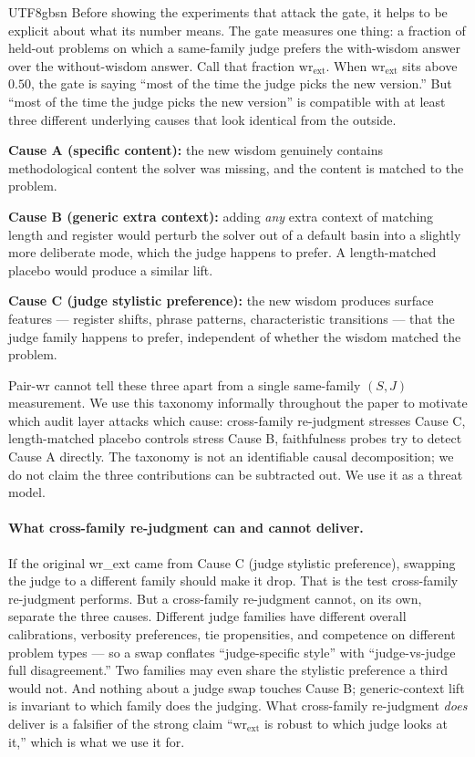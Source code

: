 \documentclass{article}
\begin{document}
\begin{CJK*}{UTF8}{gbsn}
Before showing the experiments that attack the gate, it helps to
be explicit about what its number means. The gate measures one
thing: a fraction of held-out problems on which a same-family
judge prefers the with-wisdom answer over the without-wisdom
answer. Call that fraction \(\mathrm{wr}_{\mathrm{ext}}\). When
\(\mathrm{wr}_{\mathrm{ext}}\) sits above \(0.50\), the gate is
saying ``most of the time the judge picks the new version.'' But
``most of the time the judge picks the new version'' is
compatible with at least three different underlying causes that
look identical from the outside.

\textbf{Cause A (specific content):} the new wisdom genuinely
contains methodological content the solver was missing, and the
content is matched to the problem.

\textbf{Cause B (generic extra context):} adding \emph{any} extra
context of matching length and register would perturb the solver
out of a default basin into a slightly more deliberate mode,
which the judge happens to prefer. A length-matched placebo would
produce a similar lift.

\textbf{Cause C (judge stylistic preference):} the new wisdom
produces surface features --- register shifts, phrase patterns,
characteristic transitions --- that the judge family happens to
prefer, independent of whether the wisdom matched the problem.

Pair-wr cannot tell these three apart from a single same-family
\((S, J)\) measurement. We use this taxonomy informally
throughout the paper to motivate which audit layer attacks which
cause: cross-family re-judgment stresses Cause C, length-matched
placebo controls stress Cause B, faithfulness probes try to
detect Cause A directly. The taxonomy is not an identifiable
causal decomposition; we do not claim the three contributions
can be subtracted out. We use it as a threat model.

\paragraph{What cross-family re-judgment can and cannot deliver.}
If the original wr\_ext came from Cause C (judge stylistic preference),
swapping the judge to a different family should make it drop.
That is the test cross-family re-judgment performs. But a
cross-family re-judgment cannot, on its own, separate the three
causes. Different judge families have different overall
calibrations, verbosity preferences, tie propensities, and
competence on different problem types --- so a swap conflates
``judge-specific style'' with ``judge-vs-judge full
disagreement.'' Two families may even share the stylistic
preference a third would not. And nothing about a judge swap
touches Cause B; generic-context lift is invariant to which
family does the judging. What cross-family re-judgment
\emph{does} deliver is a falsifier of the strong claim
``\(\mathrm{wr}_{\mathrm{ext}}\) is robust to which judge looks
at it,'' which is what we use it for.


\end{CJK*}
\end{document}
